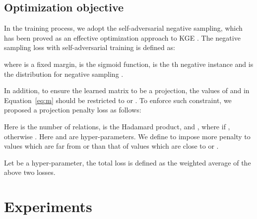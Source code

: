 \documentclass{article}
\begin{document}
\subsection{Optimization objective}
In the training process, we adopt the self-adversarial negative sampling, which has been proved as an effective optimization approach to KGE \citep{rotate}. The negative
sampling loss  with self-adversarial training is defined as:

where  is a fixed margin,  is the sigmoid function,  is the th negative instance and  is the distribution for negative sampling \citep{rotate}.

In addition, to ensure the learned matrix to be a projection, the values of  and  in Equation~\ref{eq:m} should be restricted to  or . To enforce such constraint, we proposed a projection penalty loss as follows:

Here  is the number of relations,  is the Hadamard product, and , where  if , otherwise . Here  and  are hyper-parameters. We define  to impose more penalty to values which are far from  or  than that of values which are close to  or .


Let  be a hyper-parameter, the total loss is defined as the weighted average of the above two losses.


\section{Experiments}
\label{sec:experiments}
\end{document}

